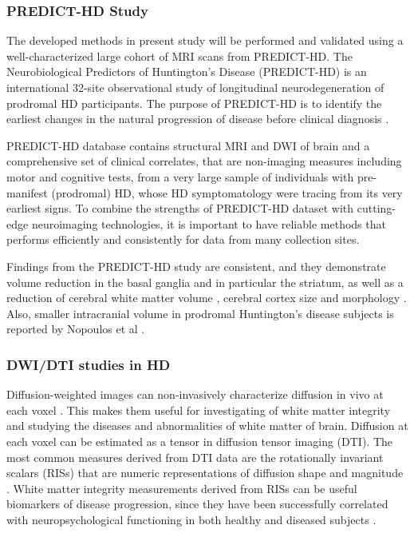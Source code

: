 \subsubsection{PREDICT-HD Study}

The developed methods in present study will be performed and validated using a well-characterized large cohort of MRI scans from PREDICT-HD. The Neurobiological Predictors of Huntington’s Disease (PREDICT-HD) is an international 32-site observational study of longitudinal neurodegeneration of prodromal HD participants. The purpose of PREDICT-HD is to identify the earliest changes in the natural progression of disease before clinical diagnosis \cite{PREDICTHD}.

PREDICT-HD database contains structural MRI and DWI of brain and a comprehensive set of clinical correlates, that are non-imaging measures including motor and cognitive tests, from a very large sample of individuals with pre-manifest (prodromal) HD, whose HD symptomatology were tracing from its very earliest signs. To combine the strengths of PREDICT-HD dataset with cutting-edge neuroimaging technologies, it is important to have reliable methods that performs efficiently and consistently for data from many collection sites.

Findings from the PREDICT-HD study are consistent, and they demonstrate volume reduction in the basal ganglia and in particular the striatum, as well as a reduction of cerebral white matter volume \cite{Paulsen2008a, Rosas2001}, cerebral cortex size \cite{Paulsen2006} and morphology \cite{Nopoulos2010}. Also, smaller intracranial volume in prodromal Huntington’s disease subjects is reported by Nopoulos et al \cite{Nopoulos2011co}.
\newline

\subsubsection{DWI/DTI studies in HD}

Diffusion-weighted images can non-invasively characterize diffusion in vivo at each voxel \cite{Basser2002}. This makes them useful for investigating of white matter integrity and studying the diseases and abnormalities of white matter of brain. Diffusion at each voxel can be estimated as a tensor in diffusion tensor imaging (DTI). The most common measures derived from DTI data are the rotationally invariant scalars (RISs) that are numeric representations of diffusion shape and magnitude \cite{Basser1996}. White matter integrity measurements derived from RISs can be useful biomarkers of disease progression, since they have been successfully correlated with neuropsychological functioning in both healthy and diseased subjects \cite{Chua2009}.

